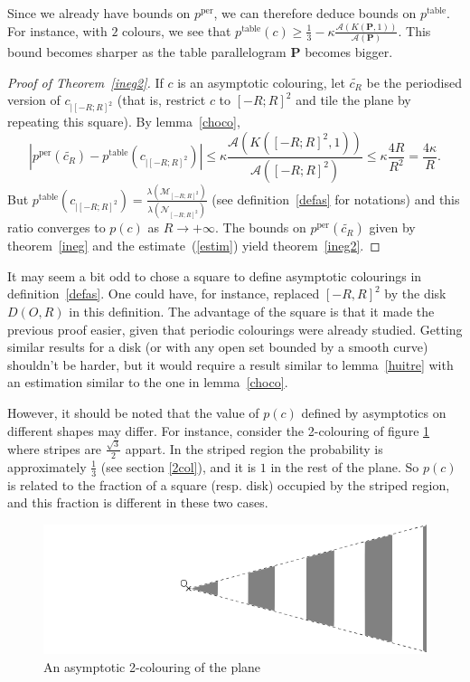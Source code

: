 \documentclass[a4paper,11pt]{article}
\theoremstyle{definition}
\theoremstyle{remark}
\newcommand{\M}{\mathcal{M}}
\newcommand{\N}{\mathcal{N}}
\newcommand{\pper}{p^{\mathrm{per}}}
\newcommand{\ptable}{p^{\mathrm{table}}}
\begin{document}
Since we already have bounds on $\pper$, we can therefore deduce bounds on $\ptable$.
For instance, with $2$ colours, we see that 
$\ptable(c) \geq \frac13 - \kappa \frac{\mathcal{A}(K(\mathbf{P},1))}{\mathcal{A}(\mathbf{P})}$. 
This bound becomes sharper as the table parallelogram $\mathbf{P}$ becomes bigger.
\begin{proof}[Proof of Theorem~\ref{ineg2}]
If $c$ is an asymptotic colouring, let $\tilde{c_R}$ be the periodised version of $c_{|[-R;R]^2}$ (that is, restrict $c$ to $[-R;R]^2$ and tile the plane by repeating this square). By lemma~\ref{choco},
\begin{equation} \label{estim}
|\pper(\tilde{c_R}) - \ptable(c_{|[-R;R]^2}) | \leq \kappa \frac{\mathcal{A}(K([-R;R]^2,1))}{\mathcal{A}([-R;R]^2)} \leq \kappa \frac{4R}{R^2} = \frac{4\kappa}{R}.
\end{equation}
But $\ptable(c_{|[-R;R]^2}) = \frac{\lambda (\M_{[-R;R]^2})}{\lambda (\N_{[-R;R]^2})}$ (see definition~\ref{defas} for notations) and this ratio converges to $p(c)$ as $R\rightarrow +\infty$. The bounds on $\pper(\tilde{c_R})$ given by theorem~\ref{ineg} and the estimate~(\ref{estim}) yield theorem~\ref{ineg2}.
\end{proof}

It may seem a bit odd to chose a square to define asymptotic colourings in definition~\ref{defas}. One could have, for instance, replaced $[-R,R]^2$ by the disk $D(O,R)$ in this definition. The advantage of the square is that it made the previous proof easier, given that periodic colourings were already studied. Getting similar results for a disk (or with any open set bounded by a smooth curve) shouldn't be harder, but it would require a result similar to lemma~\ref{huitre} with an estimation similar to the one in lemma~\ref{choco}.

However, it should be noted that the value of $p(c)$ defined by asymptotics on different shapes may differ. For instance, consider the 2-colouring of figure \ref{contrex} where stripes are $\frac{\sqrt{3}}{2}$ appart. In the striped region the probability is approximately $\frac13$ (see section \ref{2col}), and it is $1$ in the rest of the plane. So $p(c)$ is related to the fraction of a square (resp. disk) occupied by the striped region, and this fraction is different in these two cases.

\begin{figure}[!ht]
\center
\includegraphics[scale=0.45]{contrex.png}
\caption{\label{contrex} An asymptotic 2-colouring of the plane}
\end{figure}
\end{document}
